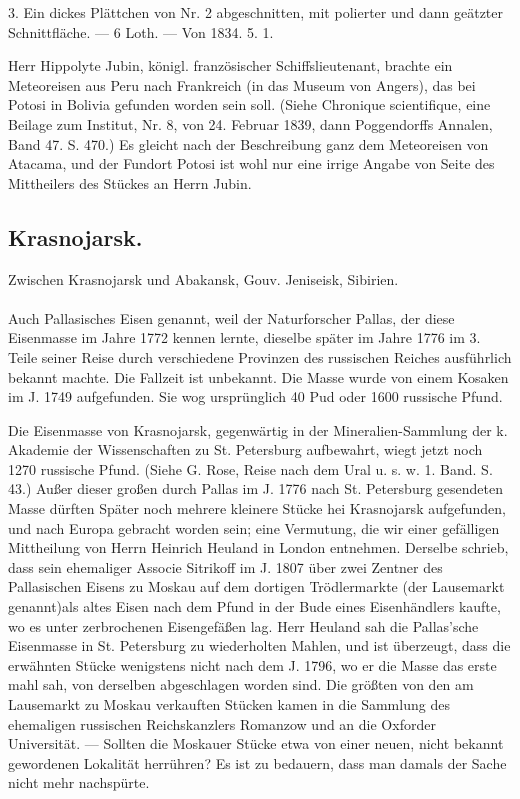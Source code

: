 \documentclass[a4paper, 11pt, oneside, polutonikogreek, german]{article}
\begin{document}
3. Ein dickes Plättchen von Nr. 2 abgeschnitten, mit polierter und dann geätzter Schnittfläche. — 6 Loth. — Von 1834. 5. 1.

Herr Hippolyte Jubin, königl. französischer Schiffslieutenant, brachte ein Meteoreisen aus Peru nach Frankreich (in das Museum von Angers), das bei Potosi in Bolivia gefunden worden sein soll. (Siehe Chronique scientifique, eine Beilage zum Institut, Nr. 8, von 24. Februar 1839, dann Poggendorffs Annalen, Band 47. S. 470.) Es gleicht nach der Beschreibung ganz dem Meteoreisen von Atacama, und der Fundort Potosi ist wohl nur eine irrige Angabe von Seite des Mittheilers des Stückes an Herrn Jubin.
\subsection{Krasnojarsk.}
\begin{center}
\small
Zwischen Krasnojarsk und Abakansk, Gouv. Jeniseisk, Sibirien.
\end{center}
\paragraph{}
Auch Pallasisches Eisen genannt, weil der Naturforscher Pallas, der diese Eisenmasse im Jahre 1772 kennen lernte, dieselbe später im Jahre 1776 im 3. Teile seiner Reise durch verschiedene Provinzen des russischen Reiches ausführlich bekannt machte. Die Fallzeit ist unbekannt. Die Masse wurde von einem Kosaken im J. 1749 aufgefunden. Sie wog ursprünglich 40 Pud oder 1600 russische Pfund.

Die Eisenmasse von Krasnojarsk, gegenwärtig in der Mineralien-Sammlung der k. Akademie der Wissenschaften zu St. Petersburg aufbewahrt, wiegt jetzt noch 1270 russische Pfund. (Siehe G. Rose, Reise nach dem Ural u. s. w. 1. Band. S. 43.) Außer dieser großen durch Pallas im J. 1776 nach St. Petersburg gesendeten Masse dürften Später noch mehrere kleinere Stücke hei Krasnojarsk aufgefunden, und nach Europa gebracht worden sein; eine Vermutung, die wir einer gefälligen Mittheilung von Herrn Heinrich Heuland in London entnehmen. Derselbe schrieb, dass sein ehemaliger Associe Sitrikoff im J. 1807 über zwei Zentner des Pallasischen Eisens zu Moskau auf dem dortigen Trödlermarkte (der Lausemarkt genannt)als altes Eisen nach dem Pfund in der Bude eines Eisenhändlers kaufte, wo es unter zerbrochenen Eisengefäßen lag. Herr Heuland sah die Pallas'sche Eisenmasse in St. Petersburg zu wiederholten Mahlen, und ist überzeugt, dass die erwähnten Stücke wenigstens nicht nach dem J. 1796, wo er die Masse das erste mahl sah, von derselben abgeschlagen worden sind. Die größten von den am Lausemarkt zu Moskau verkauften Stücken kamen in die Sammlung des ehemaligen russischen Reichskanzlers Romanzow und an die Oxforder Universität. — Sollten die Moskauer Stücke etwa von einer neuen, nicht bekannt gewordenen Lokalität herrühren? Es ist zu bedauern, dass man damals der Sache nicht mehr nachspürte.
\end{document}
